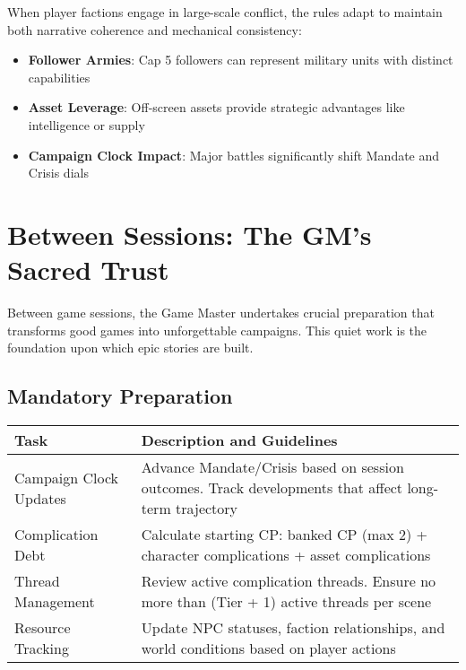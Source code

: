 When player factions engage in large-scale conflict, the rules adapt to maintain both narrative coherence and mechanical consistency:

\begin{itemize}
    \item \textbf{Follower Armies}: Cap 5 followers can represent military units with distinct capabilities
    \item \textbf{Asset Leverage}: Off-screen assets provide strategic advantages like intelligence or supply
    \item \textbf{Campaign Clock Impact}: Major battles significantly shift Mandate and Crisis dials
\end{itemize}

\section*{Between Sessions: The GM's Sacred Trust}

Between game sessions, the Game Master undertakes crucial preparation that transforms good games into unforgettable campaigns. This quiet work is the foundation upon which epic stories are built.

\subsection*{Mandatory Preparation}

\begin{fatebox}
\begin{tabularx}{\textwidth}{lX}
\toprule
\textbf{Task} & \textbf{Description and Guidelines} \\
\midrule
Campaign Clock Updates & Advance Mandate/Crisis based on session outcomes. Track developments that affect long-term trajectory \\
Complication Debt & Calculate starting CP: banked CP (max 2) + character complications + asset complications \\
Thread Management & Review active complication threads. Ensure no more than (Tier + 1) active threads per scene \\
Resource Tracking & Update NPC statuses, faction relationships, and world conditions based on player actions \\
\bottomrule
\end{tabularx}
\end{fatebox}

